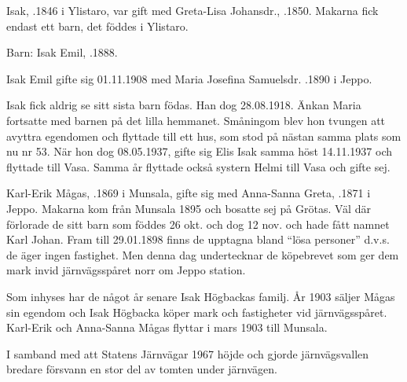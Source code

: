 Isak,  .1846 i Ylistaro, var gift med Greta-Lisa Johansdr., .1850. Makarna fick endast ett barn, det föddes i Ylistaro.

Barn: Isak Emil, .1888.

Isak Emil gifte sig 01.11.1908 med Maria Josefina Samuelsdr. .1890 i Jeppo.
\begin{jhchildren}
  \item {}
  \item {}
  \item {}
  \item {}
\end{jhchildren}
Isak fick aldrig se sitt sista barn födas. Han dog 28.08.1918. Änkan Maria fortsatte med barnen på det lilla hemmanet. Småningom blev hon tvungen att avyttra egendomen och flyttade till ett hus, som stod på nästan samma plats som nu nr 53. När hon dog 08.05.1937, gifte sig Elis Isak samma höst 14.11.1937 och flyttade till Vasa. Samma år flyttade också systern Helmi till Vasa och gifte sej.


Karl-Erik Mågas, .1869 i Munsala, gifte sig med Anna-Sanna Greta, .1871 i Jeppo. Makarna kom från Munsala 1895 och bosatte sej på Grötas. Väl där förlorade de sitt barn som föddes 26 okt. och dog 12 nov. och hade fått namnet Karl Johan. Fram till 29.01.1898 finns de upptagna bland ``lösa personer'' d.v.s. de äger ingen fastighet. Men denna dag undertecknar de köpebrevet som ger dem mark invid järnvägsspåret norr om Jeppo station.

Som inhyses har de något år senare Isak Högbackas familj. År 1903 säljer Mågas sin egendom och Isak Högbacka köper mark och fastigheter vid järnvägsspåret. Karl-Erik och Anna-Sanna Mågas flyttar i mars 1903 till Munsala.





I samband med att Statens Järnvägar 1967  höjde och gjorde 	järnvägsvallen bredare försvann en stor del av tomten under järnvägen.\jhvspace{}


